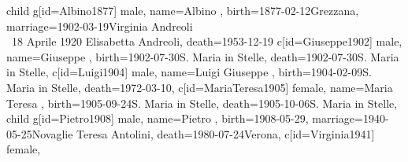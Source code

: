 \documentclass{article}
\begin{document}
\begin{midpage}
\begin{center}
\begin{genealogypicture}
{{{{{{{{{{                                    }
                                    child{
                                        g[id=Albino1877]{
                                            male,
                                            name={Albino },
                                            birth={1877-02-12}{Grezzana},
                                            marriage={1902-03-19}{Virginia Andreoli \\ \gtrsymMarried~18 Aprile 1920 \newline \hspace*{3mm} Elisabetta Andreoli},
                                            death={1953-12-19}{}
                                        }
                                        c[id=Giuseppe1902]{
                                            male,
                                            name={Giuseppe },
                                            birth={1902-07-30}{S. Maria in Stelle},
                                            death={1902-07-30}{S. Maria in Stelle},
                                        }
                                        c[id=Luigi1904]{
                                            male,
                                            name={Luigi Giuseppe },
                                            birth={1904-02-09}{S. Maria in Stelle},
                                            death={1972-03-10}{},
                                        }
                                        c[id=MariaTeresa1905]{
                                            female,
                                            name={Maria Teresa },
                                            birth={1905-09-24}{S. Maria in Stelle},
                                            death={1905-10-06}{S. Maria in Stelle},
                                        }
                                        child{
                                            g[id=Pietro1908]{
                                                male,
                                                name={Pietro },
                                                birth={1908-05-29}{},
                                                marriage={1940-05-25}{Novaglie \newline Teresa Antolini},
                                                death={1980-07-24}{Verona},
                                            }
                                            c[id=Virginia1941]{
                                                female,
}}}}}}}}}}}}
\end{genealogypicture}
\end{center}
\end{midpage}
\end{document}
